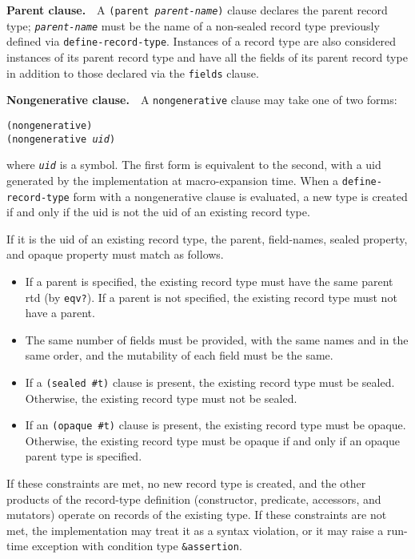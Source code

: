 \textbf{Parent clause.}  A \texttt{(parent \textit{parent-name})} clause declares the parent record type;
\texttt{\textit{parent-name}} must be the name of a non-sealed record type previously
defined via \texttt{define-record-type}.
Instances of a record type are also considered instances of its parent record
type and have all the fields of its parent record type in addition to those
declared via the \texttt{fields} clause.


\textbf{Nongenerative clause.}  A \texttt{nongenerative} clause may take one of two forms:


\begin{alltt}
(nongenerative)
(nongenerative \textit{uid})
\end{alltt}


where \texttt{\textit{uid}} is a symbol.
The first form is equivalent to the second, with a uid generated by the
implementation at macro-expansion time.
When a \texttt{define-record-type} form with a nongenerative clause is
evaluated, a new type is created if and only if the uid is not the uid
of an existing record type.


If it is the uid of an existing record type, the parent, field-names,
sealed property, and opaque property must match as follows.

\begin{itemize}
\item 
If a parent is specified, the existing record type must have the same
parent rtd (by \texttt{eqv?}).
If a parent is not specified, the existing record type must not have
a parent.

\item 
The same number of fields must be provided, with the same names and in
the same order, and the mutability of each field must be the same.

\item 
If a \texttt{(sealed \#{}t)} clause is present, the existing record type
must be sealed.
Otherwise, the existing record type must not be sealed.

\item 
If an \texttt{(opaque \#{}t)} clause is present, the existing record type
must be opaque.
Otherwise, the existing record type must be opaque if and only if
an opaque parent type is specified.

\end{itemize}


If these constraints are met, no new record type is created, and the
other products of the record-type definition (constructor, predicate,
accessors, and mutators) operate on records of the existing type.
If these constraints are not met, the implementation may treat it as a
syntax violation, or it may raise a run-time exception with condition type
\texttt{\&{}assertion}.


